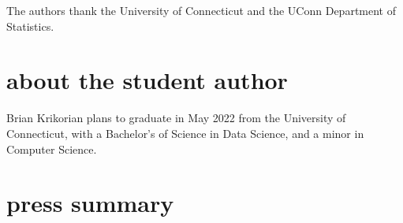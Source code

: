 \documentclass[12pt]{article}
\begin{document}

%
The authors thank the University of Connecticut and the UConn Department of Statistics.






\section*{about the student author}
Brian Krikorian plans to graduate in May 2022 from the University of Connecticut, with a Bachelor's of Science in Data Science, and a minor in Computer Science.

\section*{press summary}
\end{document}
